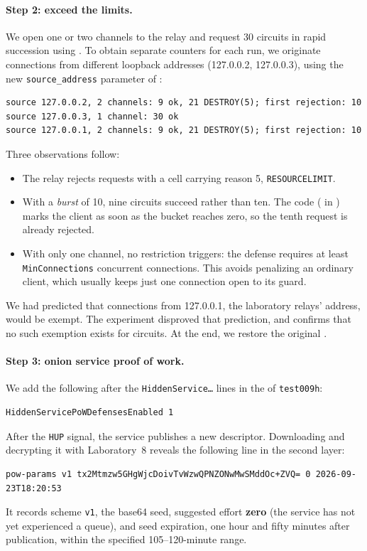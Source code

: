 \paragraph{Step 2: exceed the limits.} We open one or two channels to the relay and request 30 circuits in rapid succession using . To obtain separate counters for each run, we originate connections from different loopback addresses (127.0.0.2, 127.0.0.3), using the new \texttt{source\_address} parameter of :
\begin{lstlisting}[numbers=none]
source 127.0.0.2, 2 channels: 9 ok, 21 DESTROY(5); first rejection: 10
source 127.0.0.3, 1 channel: 30 ok
source 127.0.0.1, 2 channels: 9 ok, 21 DESTROY(5); first rejection: 10
\end{lstlisting}
Three observations follow:
\begin{itemize}
  \item The relay rejects requests with a  cell carrying reason 5, \texttt{RESOURCELIMIT}.
  \item With a \emph{burst} of 10, nine circuits succeed rather than ten. The code ( in ) marks the client as soon as the bucket reaches zero, so the tenth request is already rejected.
  \item With only one channel, no restriction triggers: the defense requires at least \texttt{MinConnections} concurrent connections. This avoids penalizing an ordinary client, which usually keeps just one connection open to its guard.
\end{itemize}
We had predicted that connections from 127.0.0.1, the laboratory relays' address, would be exempt. The experiment disproved that prediction, and  confirms that no such exemption exists for circuits. At the end, we restore the original .

\paragraph{Step 3: onion service proof of work.} We add the following after the \texttt{HiddenService\ldots} lines in the  of \texttt{test009h}:
\begin{lstlisting}[language=torrc,numbers=none]
HiddenServicePoWDefensesEnabled 1
\end{lstlisting}
After the \texttt{HUP} signal, the service publishes a new descriptor. Downloading and decrypting it with Laboratory~8 reveals the following line in the second layer:
\begin{lstlisting}[numbers=none]
pow-params v1 tx2Mtmzw5GHgWjcDoivTvWzwQPNZONwMwSMddOc+ZVQ= 0 2026-09-23T18:20:53
\end{lstlisting}
It records scheme \texttt{v1}, the base64 seed, suggested effort \textbf{zero} (the service has not yet experienced a queue), and seed expiration, one hour and fifty minutes after publication, within the specified 105--120-minute range.

